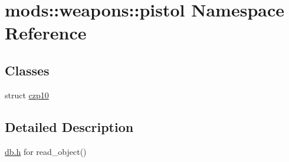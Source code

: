 \hypertarget{namespacemods_1_1weapons_1_1pistol}{}\section{mods\+:\+:weapons\+:\+:pistol Namespace Reference}
\label{namespacemods_1_1weapons_1_1pistol}
\subsection*{Classes}
\begin{DoxyCompactItemize}
\item 
struct \hyperlink{structmods_1_1weapons_1_1pistol_1_1czp10}{czp10}
\end{DoxyCompactItemize}


\subsection{Detailed Description}
\hyperlink{db_8h_source}{db.\+h} for read\+\_\+object() 